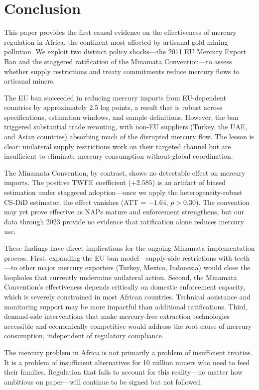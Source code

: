 \documentclass[12pt]{article}
\begin{document}
\section{Conclusion}

This paper provides the first causal evidence on the effectiveness of mercury regulation in Africa, the continent most affected by artisanal gold mining pollution. We exploit two distinct policy shocks---the 2011 EU Mercury Export Ban and the staggered ratification of the Minamata Convention---to assess whether supply restrictions and treaty commitments reduce mercury flows to artisanal miners.

The EU ban succeeded in reducing mercury imports from EU-dependent countries by approximately 2.5 log points, a result that is robust across specifications, estimation windows, and sample definitions. However, the ban triggered substantial trade rerouting, with non-EU suppliers (Turkey, the UAE, and Asian countries) absorbing much of the disrupted mercury flow. The lesson is clear: unilateral supply restrictions work on their targeted channel but are insufficient to eliminate mercury consumption without global coordination.

The Minamata Convention, by contrast, shows no detectable effect on mercury imports. The positive TWFE coefficient ($+2.585$) is an artifact of biased estimation under staggered adoption---once we apply the heterogeneity-robust CS-DiD estimator, the effect vanishes (ATT = $-1.64$, $p > 0.30$). The convention may yet prove effective as NAPs mature and enforcement strengthens, but our data through 2023 provide no evidence that ratification alone reduces mercury use.

These findings have direct implications for the ongoing Minamata implementation process. First, expanding the EU ban model---supply-side restrictions with teeth---to other major mercury exporters (Turkey, Mexico, Indonesia) would close the loopholes that currently undermine unilateral action. Second, the Minamata Convention's effectiveness depends critically on domestic enforcement capacity, which is severely constrained in most African countries. Technical assistance and monitoring support may be more impactful than additional ratifications. Third, demand-side interventions that make mercury-free extraction technologies accessible and economically competitive would address the root cause of mercury consumption, independent of regulatory compliance.

The mercury problem in Africa is not primarily a problem of insufficient treaties. It is a problem of insufficient alternatives for 10 million miners who need to feed their families. Regulation that fails to account for this reality---no matter how ambitious on paper---will continue to be signed but not followed.
\end{document}
